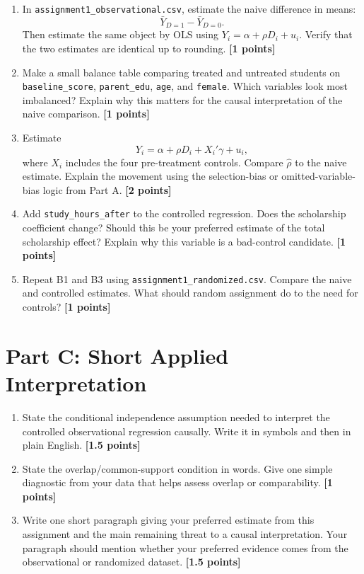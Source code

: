 \documentclass[11pt]{article}
\newcommand{\points}[1]{\hfill \textbf{[#1 points]}}
\begin{document}
\begin{enumerate}[label=B\arabic*.]
  \item In \texttt{assignment1\_observational.csv}, estimate the naive difference in means:
  \[
    \bar{Y}_{D=1}-\bar{Y}_{D=0}.
  \]
  Then estimate the same object by OLS using \(Y_i=\alpha+\rho D_i+u_i\). Verify that the two estimates are identical up to rounding. \points{1}

  \item Make a small balance table comparing treated and untreated students on \texttt{baseline\_score}, \texttt{parent\_edu}, \texttt{age}, and \texttt{female}. Which variables look most imbalanced? Explain why this matters for the causal interpretation of the naive comparison. \points{1}

  \item Estimate
  \[
    Y_i=\alpha+\rho D_i+X_i'\gamma+u_i,
  \]
  where \(X_i\) includes the four pre-treatment controls. Compare \(\hat{\rho}\) to the naive estimate. Explain the movement using the selection-bias or omitted-variable-bias logic from Part A. \points{2}

  \item Add \texttt{study\_hours\_after} to the controlled regression. Does the scholarship coefficient change? Should this be your preferred estimate of the total scholarship effect? Explain why this variable is a bad-control candidate. \points{1}

  \item Repeat B1 and B3 using \texttt{assignment1\_randomized.csv}. Compare the naive and controlled estimates. What should random assignment do to the need for controls? \points{1}
\end{enumerate}

\section*{Part C: Short Applied Interpretation}

\begin{enumerate}[label=C\arabic*.]
  \item State the conditional independence assumption needed to interpret the controlled observational regression causally. Write it in symbols and then in plain English. \points{1.5}

  \item State the overlap/common-support condition in words. Give one simple diagnostic from your data that helps assess overlap or comparability. \points{1}

  \item Write one short paragraph giving your preferred estimate from this assignment and the main remaining threat to a causal interpretation. Your paragraph should mention whether your preferred evidence comes from the observational or randomized dataset. \points{1.5}
\end{enumerate}
\end{document}
